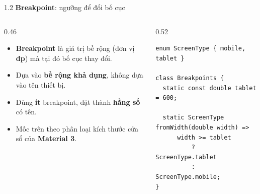 \documentclass[aspectratio=169,10pt]{beamer}
\begin{document}
\begin{frame}[fragile]{1.2 \textbf{Breakpoint}: ngưỡng để đổi bố cục}
  \centering

  \vspace{6pt}
  \begin{columns}[T]
    \begin{column}{0.46\textwidth}
      \small
      \begin{itemize}\itemsep3pt
        \item \textbf{Breakpoint} là giá trị bề rộng (đơn vị \textbf{dp}) mà tại đó bố cục thay đổi.
        \item Dựa vào \textbf{bề rộng khả dụng}, không dựa vào tên thiết bị.
        \item Dùng \textbf{ít} breakpoint, đặt thành \textbf{hằng số} có tên.
        \item Mốc trên theo phân loại kích thước cửa sổ của \textbf{Material 3}.
      \end{itemize}
    \end{column}
    \begin{column}{0.52\textwidth}
\begin{lstlisting}[basicstyle=\ttfamily\fontsize{6.8}{8}\selectfont]
enum ScreenType { mobile, tablet }

class Breakpoints {
  static const double tablet = 600;

  static ScreenType fromWidth(double width) =>
      width >= tablet
          ? ScreenType.tablet
          : ScreenType.mobile;
}
\end{lstlisting}
    \end{column}
  \end{columns}
\end{frame}
\end{document}

